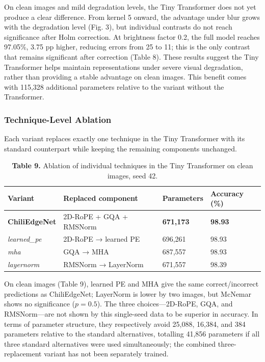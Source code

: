 On clean images and mild degradation levels, the Tiny Transformer does not yet produce a clear difference. From kernel 5 onward, the advantage under blur grows with the degradation level (Fig. 3), but individual contrasts do not reach significance after Holm correction. At brightness factor 0.2, the full model reaches 97.05\%, 3.75 pp higher, reducing errors from 25 to 11; this is the only contrast that remains significant after correction (Table 8). These results suggest the Tiny Transformer helps maintain representations under severe visual degradation, rather than providing a stable advantage on clean images. This benefit comes with 115,328 additional parameters relative to the variant without the Transformer.

\subsubsection{Technique-Level Ablation}\label{technique-level-ablation}

Each variant replaces exactly one technique in the Tiny Transformer with its standard counterpart while keeping the remaining components unchanged.

\begin{table}[H]
\centering
\caption*{\textbf{Table 9.} Ablation of individual techniques in the Tiny Transformer on clean images, seed 42.}
\label{tab:9}
\footnotesize
\setlength{\tabcolsep}{3pt}
\renewcommand{\arraystretch}{1.15}
\begin{tabular}{llll}
\toprule
\textbf{Variant} & \textbf{Replaced component} & \textbf{Parameters} & \textbf{Accuracy (\%)} \\
\midrule
\textbf{ChiliEdgeNet} & 2D-RoPE + GQA + RMSNorm & \textbf{671,173} & \textbf{98.93} \\
\emph{learned\_pe} & 2D-RoPE → learned PE & 696,261 & 98.93 \\
\emph{mha} & GQA → MHA & 687,557 & 98.93 \\
\emph{layernorm} & RMSNorm → LayerNorm & 671,557 & 98.39 \\
\bottomrule
\end{tabular}
\end{table}

On clean images (Table 9), learned PE and MHA give the same correct/incorrect predictions as ChiliEdgeNet; LayerNorm is lower by two images, but McNemar shows no significance ($p = 0.5$). The three choices---2D-RoPE, GQA, and RMSNorm---are not shown by this single-seed data to be superior in accuracy. In terms of parameter structure, they respectively avoid 25,088, 16,384, and 384 parameters relative to the standard alternatives, totalling 41,856 parameters if all three standard alternatives were used simultaneously; the combined three-replacement variant has not been separately trained.


